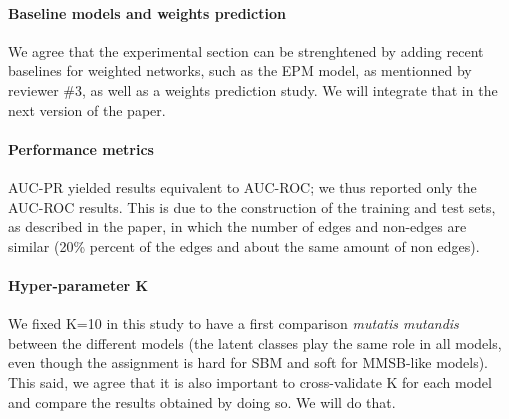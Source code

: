 \documentclass{article}
\begin{document}
\paragraph{Baseline models and weights prediction} We agree that the experimental section can be strenghtened by adding recent baselines for weighted networks, such as the EPM model, as mentionned by reviewer \#3, as well as a weights prediction study. We will integrate that in the next version of the paper.

\paragraph{Performance metrics}  AUC-PR yielded results equivalent to AUC-ROC; we thus reported only the AUC-ROC results. This is due to the construction of the training and test sets, as described in the paper, in which the number of edges and non-edges are similar (20\% percent of the edges and about the same amount of non edges).

\paragraph{Hyper-parameter K} We fixed K=10 in this study to have a first comparison \textit{mutatis mutandis} between the different models (the latent classes play the same role in all models, even though the assignment is hard for SBM and soft for MMSB-like models). This said, we agree that it is also important to cross-validate K for each model and compare the results obtained by doing so. We will do that.
\end{document}
